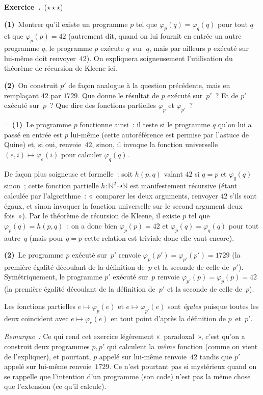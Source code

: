 \documentclass[12pt,a4paper]{article}
\theoremstyle{definition}
\newcommand\exercice{%
\refstepcounter{comcnt}\bigskip\noindent\textbf{Exercice~\thecomcnt.}}
\newif\ifcorrige
\newenvironment{corrige}%
{\ifcorrige\relax\else\setbox0=\vbox\bgroup\fi%
\smallbreak\footnotesize\noindent{\underbar{\textit{Corrigé.}}\quad}}
{{\hbox{}\nobreak\hfill\checkmark}%
\ifcorrige\relax\else\egroup\fi\par}
\begin{document}
%

\exercice\ (${\star}{\star}{\star}$)\par\nobreak

\textbf{(1)} Montrer qu'il existe un programme $p$ tel que
$\varphi_p(q) = \varphi_q(q)$ pour tout $q$ et que $\varphi_p(p) = 42$
(autrement dit, quand on lui fournit en entrée un autre programme $q$,
le programme $p$ exécute $q$ sur $q$, mais par ailleurs $p$ exécuté
sur lui-même doit renvoyer $42$).  On expliquera soigneusement
l'utilisation du théorème de récursion de Kleene ici.

\textbf{(2)} On construit $p'$ de façon analogue à la question
précédente, mais en remplaçant $42$ par $1729$.  Que donne le résultat
de $p$ exécuté sur $p'$ ?  Et de $p'$ exécuté sur $p$ ?  Que dire des
fonctions partielles $\varphi_p$ et $\varphi_{p'}$ ?

\begin{corrige}
\textbf{(1)} Le programme $p$ fonctionne ainsi : il teste si le
programme $q$ qu'on lui a passé en entrée est $p$ lui-même (cette
autoréférence est permise par l'astuce de Quine) et, si oui,
renvoie $42$, sinon, il invoque la fonction universelle $(e,i) \mapsto
\varphi_e(i)$ pour calculer $\varphi_q(q)$.

De façon plus soigneuse et formelle : soit $h(p,q)$ valant $42$ si
$q=p$ et $\varphi_q(q)$ sinon ; cette fonction partielle $h \colon
\mathbb{N}^2 \dasharrow \mathbb{N}$ est manifestement récursive (étant
calculée par l'algorithme : « comparer les deux arguments, renvoyer
$42$ s'ils sont égaux, et sinon invoquer la fonction universelle sur
le second argument deux fois »).  Par le théorème de récursion de
Kleene, il existe $p$ tel que $\varphi_p(q) = h(p,q)$ : on a donc bien
$\varphi_p(p) = 42$ et $\varphi_p(q) = \varphi_q(q)$ pour tout
autre $q$ (mais pour $q=p$ cette relation est triviale donc elle vaut
encore).

\textbf{(2)} Le programme $p$ exécuté sur $p'$ renvoie $\varphi_p(p')
= \varphi_{p'}(p') = 1729$ (la première égalité découlant de la
définition de $p$ et la seconde de celle de $p'$).  Symétriquement, le
programme $p'$ exécuté sur $p$ renvoie $\varphi_{p'}(p) = \varphi_p(p)
= 42$ (la première égalité découlant de la définition de $p'$ et la
seconde de celle de $p$).

Les fonctions partielles $e \mapsto \varphi_p(e)$ et $e \mapsto
\varphi_{p'}(e)$ sont \emph{égales} puisque toutes les deux coïncident
avec $e \mapsto \varphi_e(e)$ en tout point d'après la définition de
$p$ et $p'$.

\emph{Remarque :} Ce qui rend cet exercice légèrement « paradoxal »,
c'est qu'on a construit deux programmes $p,p'$ qui calculent la
\emph{même} fonction (comme on vient de l'expliquer), et pourtant, $p$
appelé sur lui-même renvoie $42$ tandis que $p'$ appelé sur lui-même
renvoie $1729$.  Ce n'est pourtant pas si mystérieux quand on se
rappelle que l'intention d'un programme (son code) n'est pas la même
chose que l'extension (ce qu'il calcule).
\end{corrige}
\end{document}
